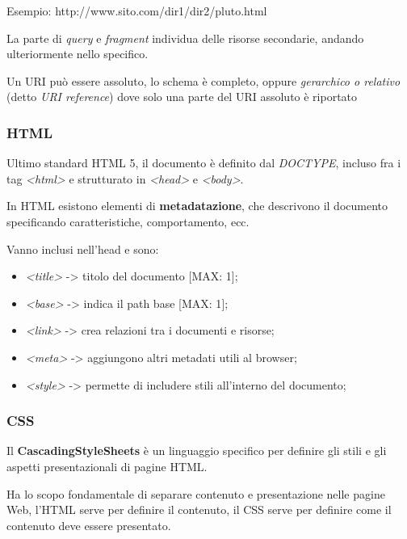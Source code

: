 Esempio: http://www.sito.com/dir1/dir2/pluto.html

La parte di \emph{query} e \emph{fragment} individua delle risorse
secondarie, andando ulteriormente nello specifico.

Un URI può essere assoluto, lo schema è completo, oppure
\emph{gerarchico o relativo} (detto \emph{URI reference}) dove solo una
parte del URI assoluto è riportato

\subsubsection{HTML}\label{html}

Ultimo standard HTML 5, il documento è definito dal \emph{DOCTYPE},
incluso fra i tag \emph{\textless html\textgreater{}} e strutturato in
\emph{\textless head\textgreater{}} e
\emph{\textless body\textgreater{}}.

In HTML esistono elementi di \textbf{metadatazione}, che descrivono il
documento specificando caratteristiche, comportamento, ecc.

Vanno inclusi nell'head e sono:

\begin{itemize}
\item
  \emph{\textless title\textgreater{}} -\textgreater{} titolo del
  documento {[}MAX: 1{]};
\item
  \emph{\textless base\textgreater{}} -\textgreater{} indica il path
  base {[}MAX: 1{]};
\item
  \emph{\textless link\textgreater{}} -\textgreater{} crea relazioni tra
  i documenti e risorse;
\item
  \emph{\textless meta\textgreater{}} -\textgreater{} aggiungono altri
  metadati utili al browser;
\item
  \emph{\textless style\textgreater{}} -\textgreater{} permette di
  includere stili all'interno del documento;
\end{itemize}

\subsubsection{CSS}\label{css}

Il \textbf{CascadingStyleSheets} è un linguaggio specifico per definire
gli stili e gli aspetti presentazionali di pagine HTML.

Ha lo scopo fondamentale di separare contenuto e presentazione nelle
pagine Web, l'HTML serve per definire il contenuto, il CSS serve per
definire come il contenuto deve essere presentato.

